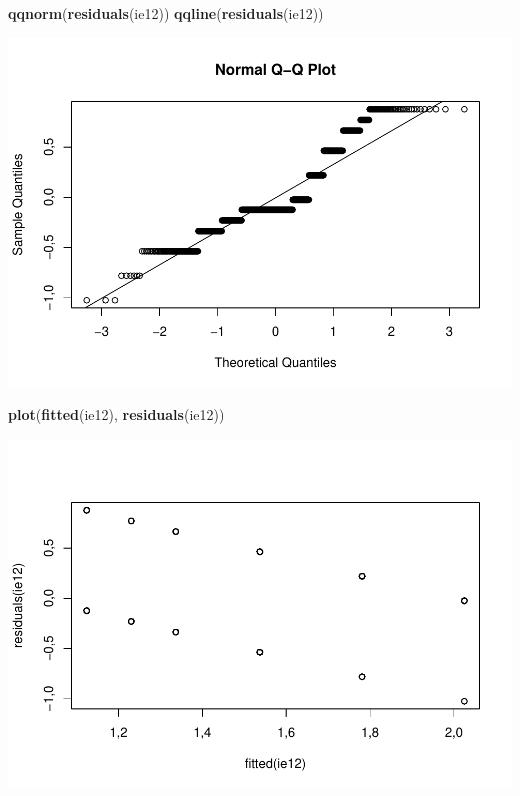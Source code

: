 \documentclass[]{article}
\newenvironment{Shaded}{\begin{snugshade}}{\end{snugshade}}
\newcommand{\KeywordTok}[1]{\textcolor[rgb]{0.13,0.29,0.53}{\textbf{#1}}}
\newcommand{\NormalTok}[1]{#1}
\begin{document}
\begin{Shaded}
\begin{Highlighting}[]
\KeywordTok{qqnorm}\NormalTok{(}\KeywordTok{residuals}\NormalTok{(ie12))}
\KeywordTok{qqline}\NormalTok{(}\KeywordTok{residuals}\NormalTok{(ie12))}
\end{Highlighting}
\end{Shaded}

\includegraphics{titanicDataClean_files/figure-latex/unnamed-chunk-25-9.pdf}

\begin{Shaded}
\begin{Highlighting}[]
\KeywordTok{plot}\NormalTok{(}\KeywordTok{fitted}\NormalTok{(ie12), }\KeywordTok{residuals}\NormalTok{(ie12))}
\end{Highlighting}
\end{Shaded}

\includegraphics{titanicDataClean_files/figure-latex/unnamed-chunk-25-10.pdf}
\end{document}
